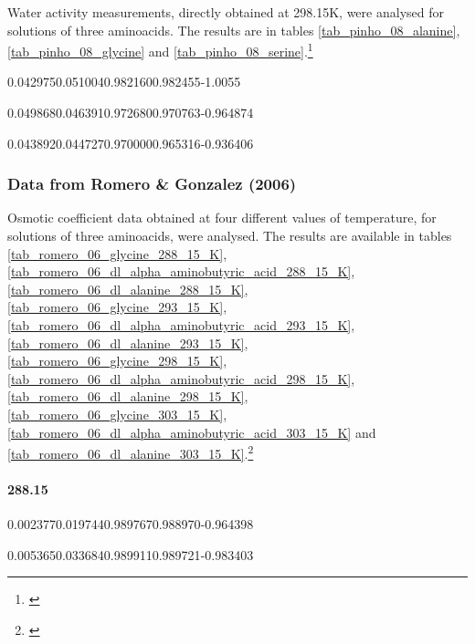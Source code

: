 Water activity measurements, directly obtained at 298.15K, were analysed for
solutions of three aminoacids. The results are in tables
\ref{tab_pinho_08_alanine}, \ref{tab_pinho_08_glycine} and
\ref{tab_pinho_08_serine}.\footnote{\cite{pinho2008}}


%
	{0.042975}{0.051004}{0.982160}{0.982455}{-1.0055}

%
	{0.049868}{0.046391}{0.972680}{0.970763}{-0.964874}

%
	{0.043892}{0.044727}{0.970000}{0.965316}{-0.936406}

\FloatBarrier

\subsubsection{Data from Romero \& Gonzalez (2006)}

Osmotic coefficient data obtained at four different values of temperature, for
solutions of three aminoacids, were analysed. The results are available in tables
\ref{tab_romero_06_glycine_288_15_K},
\ref{tab_romero_06_dl_alpha_aminobutyric_acid_288_15_K},
\ref{tab_romero_06_dl_alanine_288_15_K}, \ref{tab_romero_06_glycine_293_15_K},
\ref{tab_romero_06_dl_alpha_aminobutyric_acid_293_15_K},
\ref{tab_romero_06_dl_alanine_293_15_K}, \ref{tab_romero_06_glycine_298_15_K},
\ref{tab_romero_06_dl_alpha_aminobutyric_acid_298_15_K},
\ref{tab_romero_06_dl_alanine_298_15_K}, \ref{tab_romero_06_glycine_303_15_K},
\ref{tab_romero_06_dl_alpha_aminobutyric_acid_303_15_K}
and \ref{tab_romero_06_dl_alanine_303_15_K}.\footnote{\cite{romero2006}}


\paragraph{288.15}


%
	{0.002377}{0.019744}{0.989767}{0.988970}{-0.964398}

%
	{0.005365}{0.033684}{0.989911}{0.989721}{-0.983403}

